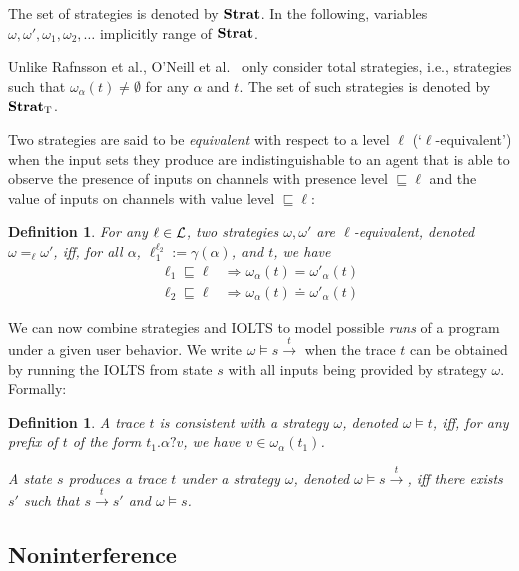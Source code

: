 \documentclass[preprint,5p,twocolumn]{elsarticle}
\newtheorem{definition}[theorem]{Definition}
\begin{document}
The set of strategies is denoted by $\mathbf{Strat}$. In the following, variables $\omega, \omega', \omega_1, \omega_2, \dots$ implicitly range of $\mathbf{Strat}$.

Unlike Rafnsson et al., O'Neill et al.~\cite{ONeill2006} only consider total strategies, i.e.,
strategies such that $\omega_\alpha(t) \neq \emptyset$ for any $\alpha$ and $t$. The set of such strategies is denoted by $\mathbf{Strat}_{\mathrm{T}}$.

Two strategies are said to be \emph{equivalent} with respect to a level $\ell$ (`$\ell$-equivalent')
when the input sets they produce are indistinguishable to an agent that is able to observe
the presence of inputs on channels with presence level $\sqsubseteq \ell$ and the value of inputs
on channels with value level $\sqsubseteq \ell$:

\begin{definition}
  For any $\ell \in \mathcal{L}$, two strategies $\omega, \omega'$ are $\ell$-equivalent, denoted $\omega =_{\ell} \omega'$, iff, for all $\alpha$, $\ell_1^{\ell_2} := \gamma(\alpha)$, and $t$, we have
  \begin{align*}
    \ell_1 \sqsubseteq \ell &\Longrightarrow \omega_\alpha(t) = \omega'_\alpha (t) \\
    \ell_2 \sqsubseteq \ell &\Longrightarrow \omega_\alpha(t) \doteq \omega'_\alpha (t)
  \end{align*}
\end{definition}

We can now combine strategies and IOLTS to model possible \emph{runs} of a program under a
given user behavior. We write $\omega \models s \xrightarrow{t}$ when the trace $t$ can be
obtained by running the IOLTS from state $s$ with all inputs being provided by strategy $\omega$.
Formally:

\begin{definition}
  A trace $t$ is \emph{consistent} with a strategy $\omega$, denoted $\omega \models t$, iff, for any prefix of $t$
  of the form $t_1. \alpha ? v$, we have $v \in \omega_\alpha(t_1)$.

  A state $s$ \emph{produces a trace $t$ under a strategy $\omega$}, denoted $\omega \models s \xrightarrow{t}$, iff there exists $s'$ such that $s \xrightarrow{t} s'$ and $\omega \models s$.
\end{definition}

\subsection{Noninterference}
\end{document}

